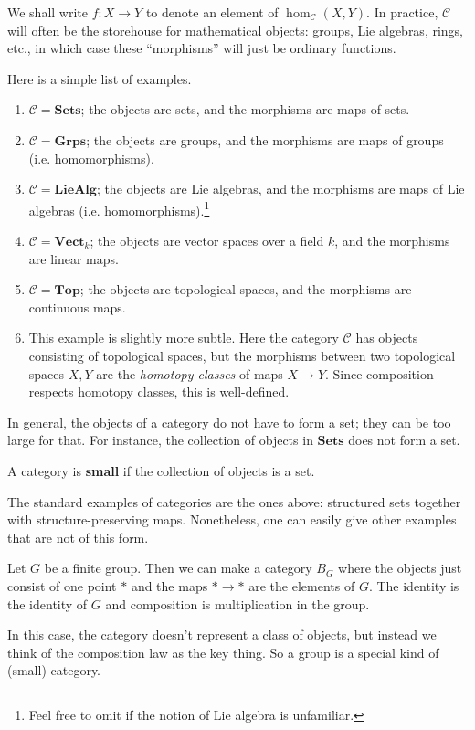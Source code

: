 We shall write $f: X \to Y$ to denote an element of $\hom_{\mathcal{C}}(X, Y)$.
In practice, $\mathcal{C}$ will often be the storehouse for mathematical objects: groups, Lie algebras,
rings, etc., in which case these ``morphisms'' will just be ordinary functions.

Here is a simple list of examples.
\begin{example}
\begin{enumerate}
\item $\mathcal{C}  = \mathbf{Sets}$; the objects are sets, and the morphisms
are maps of sets.
\item $\mathcal{C} = \mathbf{Grps}$; the objects are groups, and the morphisms
are maps of groups (i.e. homomorphisms).
\item $\mathcal{C} = \mathbf{LieAlg}$; the objects are Lie algebras, and the
morphisms are maps of Lie algebras (i.e. homomorphisms).\footnote{Feel free to
omit if the notion of Lie algebra is unfamiliar.}
\item  $\mathcal{C} = \mathbf{Vect}_k$; the objects are vector spaces over a
field $k$, and the morphisms are linear maps.
\item $\mathcal{C} = \mathbf{Top}$; the objects are topological spaces, and the
morphisms are continuous maps.
\item  This example is slightly more subtle. Here the category $\mathcal{C}$
has objects consisting of topological spaces, but the morphisms between two
topological spaces $X,Y$ are the \emph{homotopy classes} of maps $X \to Y$.
Since composition respects homotopy classes, this is well-defined.
\end{enumerate}
\end{example}



In general, the objects of a category do not have to form a set; they can
be too large for
that.
For instance, the collection of objects in $\mathbf{Sets}$ does not form a set.


\begin{definition}
A category is \textbf{small} if the collection of objects is a set.
\end{definition}

The standard examples of categories are the ones above: structured sets
together with structure-preserving maps. Nonetheless, one can easily give
other examples that are not of this form.

\begin{example}
Let $G$ be a finite group. Then we can make a category $B_G$ where the objects
just consist of one point $\ast$ and the maps $\ast \to \ast$ are the elements
of $G$. The identity is the identity of $G$ and composition is multiplication
in the group.

In this case, the category doesn't represent  a class of objects, but
instead we think of the composition law as the key thing. So a group is a
special kind of (small) category.
\end{example}

